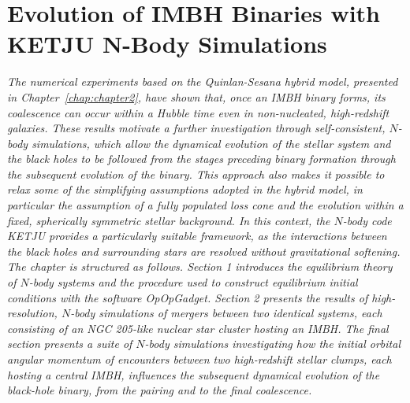 \documentclass[12pt,twoside,openany]{book}
\begin{document}
\chapter{Evolution of IMBH Binaries with KETJU N-Body Simulations}\label{chap:chapter3}



\vspace*{\fill}

\begin{center}
\begin{minipage}{0.65\textwidth}
\centering
\textit{The numerical experiments based on the Quinlan-Sesana hybrid model, presented in Chapter~\ref{chap:chapter2}, have shown that, once an IMBH binary forms, its coalescence can occur within a Hubble time even in non-nucleated, high-redshift galaxies. These results motivate a further investigation through self-consistent, $N$-body simulations, which allow the dynamical evolution of the stellar system and the black holes to be followed from the stages preceding binary formation through the subsequent evolution of the binary. This approach also makes it possible to relax some of the simplifying assumptions adopted in the hybrid model, in particular the assumption of a fully populated loss cone and the evolution within a fixed, spherically symmetric stellar background. In this context, the $N$-body code KETJU provides a particularly suitable framework, as the interactions between the black holes and surrounding stars are resolved without gravitational softening.\\The chapter is structured as follows. Section 1 introduces the equilibrium theory of $N$-body systems and the procedure used to construct equilibrium initial conditions with the software OpOpGadget. Section 2 presents the results of high-resolution, $N$-body simulations of mergers between two identical systems, each consisting of an NGC 205-like nuclear star cluster hosting an IMBH. The final section presents a suite of $N$-body simulations investigating how the initial orbital angular momentum of encounters between two high-redshift stellar clumps, each hosting a central IMBH, influences the subsequent dynamical evolution of the black-hole binary, from the pairing and to the final coalescence.
}
\end{minipage}
\end{center}

\vspace*{\fill}
\end{document}
